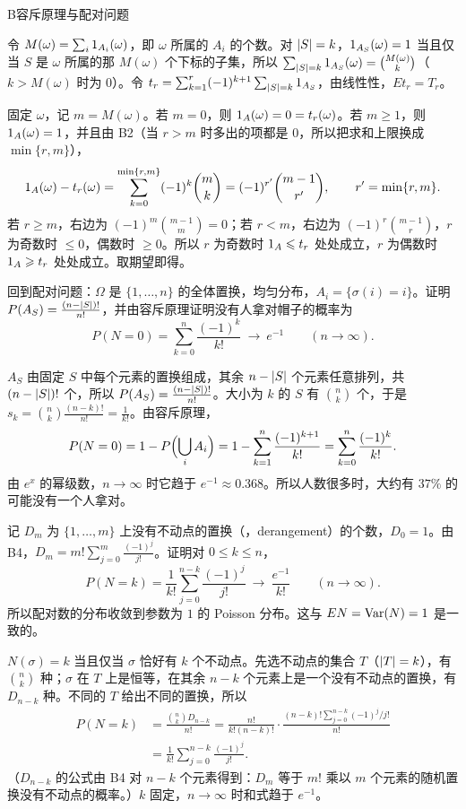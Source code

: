 \begin{probleme}{B}{容斥原理与配对问题}
\begin{questions}
\begin{solution}
令 $M(\omega)=\sum_i1_{A_i}(\omega)$，即 $\omega$ 所属的 $A_i$ 的个数。对 $\lvert S\rvert=k$，$1_{A_S}(\omega)=1$ 当且仅当 $S$ 是 $\omega$ 所属的那 $M(\omega)$ 个下标的子集，所以 $\sum_{\lvert S\rvert=k}1_{A_S}(\omega)=\binom{M(\omega)}k$（$k>M(\omega)$ 时为 $0$）。令 $t_r=\sum_{k=1}^r(-1)^{k+1}\sum_{\lvert S\rvert=k}1_{A_S}$，由线性性，$Et_r=T_r$。

固定 $\omega$，记 $m=M(\omega)$。若 $m=0$，则 $1_A(\omega)=0=t_r(\omega)$。若 $m\geqslant1$，则 $1_A(\omega)=1$，并且由 B2（当 $r>m$ 时多出的项都是 $0$，所以把求和上限换成 $\min\{r,m\}$），
\[
1_A(\omega)-t_r(\omega)=\sum_{k=0}^{\min\{r,m\}}(-1)^k\binom mk=(-1)^{r'}\binom{m-1}{r'},\qquad r'=\min\{r,m\}.
\]
若 $r\geqslant m$，右边为 $(-1)^m\binom{m-1}m=0$；若 $r<m$，右边为 $(-1)^r\binom{m-1}r$，$r$ 为奇数时 $\leqslant0$，偶数时 $\geqslant0$。所以 $r$ 为奇数时 $1_A\leqslant t_r$ 处处成立，$r$ 为偶数时 $1_A\geqslant t_r$ 处处成立。取期望即得。
\end{solution}

\item 回到配对问题：$\Omega$ 是 $\{1,\dots,n\}$ 的全体置换，均匀分布，$A_i=\{\sigma(i)=i\}$。证明 $P(A_S)=\frac{(n-\lvert S\rvert)!}{n!}$，并由容斥原理证明没有人拿对帽子的概率为
\[
P(N=0)=\sum_{k=0}^n\frac{(-1)^k}{k!}\ \longrightarrow\ e^{-1}\qquad(n\to\infty).
\]
\begin{solution}
$A_S$ 由固定 $S$ 中每个元素的置换组成，其余 $n-\lvert S\rvert$ 个元素任意排列，共 $(n-\lvert S\rvert)!$ 个，所以 $P(A_S)=\frac{(n-\lvert S\rvert)!}{n!}$。大小为 $k$ 的 $S$ 有 $\binom nk$ 个，于是 $s_k=\binom nk\frac{(n-k)!}{n!}=\frac1{k!}$。由容斥原理，
\[
P(N=0)=1-P\Bigl(\bigcup_iA_i\Bigr)=1-\sum_{k=1}^n\frac{(-1)^{k+1}}{k!}=\sum_{k=0}^n\frac{(-1)^k}{k!}.
\]
由 $e^x$ 的幂级数，$n\to\infty$ 时它趋于 $e^{-1}\approx0.368$。所以人数很多时，大约有 $37\%$ 的可能没有一个人拿对。
\end{solution}

\item 记 $D_m$ 为 $\{1,\dots,m\}$ 上没有不动点的置换（，derangement）的个数，$D_0=1$。由 B4，$D_m=m!\sum_{j=0}^m\frac{(-1)^j}{j!}$。证明对 $0\leqslant k\leqslant n$，
\[
P(N=k)=\frac1{k!}\sum_{j=0}^{n-k}\frac{(-1)^j}{j!}\ \longrightarrow\ \frac{e^{-1}}{k!}\qquad(n\to\infty).
\]
所以配对数的分布收敛到参数为 $1$ 的 Poisson 分布。这与 $EN=\operatorname{Var}(N)=1$ 是一致的。
\begin{solution}
$N(\sigma)=k$ 当且仅当 $\sigma$ 恰好有 $k$ 个不动点。先选不动点的集合 $T$（$\lvert T\rvert=k$），有 $\binom nk$ 种；$\sigma$ 在 $T$ 上是恒等，在其余 $n-k$ 个元素上是一个没有不动点的置换，有 $D_{n-k}$ 种。不同的 $T$ 给出不同的置换，所以
\[
\begin{aligned}
P(N=k)&=\frac{\binom nkD_{n-k}}{n!}=\frac{n!}{k!(n-k)!}\cdot\frac{(n-k)!\sum_{j=0}^{n-k}(-1)^j/j!}{n!}\\
&=\frac1{k!}\sum_{j=0}^{n-k}\frac{(-1)^j}{j!}.
\end{aligned}
\]
（$D_{n-k}$ 的公式由 B4 对 $n-k$ 个元素得到：$D_m$ 等于 $m!$ 乘以 $m$ 个元素的随机置换没有不动点的概率。）$k$ 固定，$n\to\infty$ 时和式趋于 $e^{-1}$。
\end{solution}
\end{questions}
\end{probleme}

